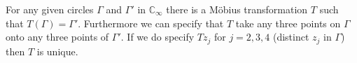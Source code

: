 For any given circles $\Gamma$ and $\Gamma'$ in $\mathbb{C}_\infty$ there is a M\"obius transformation $T$ such that $T(\Gamma) = \Gamma'$. Furthermore we can specify that $T$ take any three points on $\Gamma$ onto any three points of $\Gamma'$. If we do specify $Tz_j$ for $j = 2, 3, 4$ (distinct $z_j$ in $\Gamma$) then $T$ is unique.
